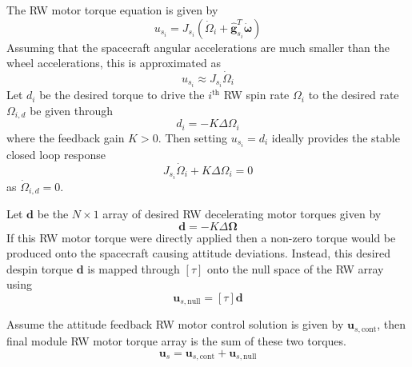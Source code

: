 The RW motor torque equation is given by\cite{schaub}
\begin{equation}
	u_{s_{i}} = J_{s_{i}} (\dot\Omega_{i} + \hat{\bm g}_{s_{i}}^{T} \dot{\bm \omega} )
\end{equation}
Assuming that the spacecraft angular accelerations are much smaller than the wheel accelerations, this is approximated as
\begin{equation}
	u_{s_{i}} \approx J_{s_{i}} \dot\Omega_{i}
\end{equation}
Let $d_{i}$ be the desired torque to drive the $i^{\text{th}}$ RW spin rate $\Omega_{i}$  to the desired rate $\Omega_{i,d}$ be given through
\begin{equation}
	d_{i} = - K \Delta\Omega_{i}
\end{equation}
where the feedback gain $K>0$.  Then setting $u_{s_{i}} = d_{i}$ ideally provides the stable closed loop response
\begin{equation}
	J_{s_{i}} \dot\Omega_{i} + K\Delta\Omega_{i} = 0
\end{equation}
as $\dot\Omega_{i,d} = 0$.  



Let $\bm d$ be the $N\times 1$ array of desired RW decelerating motor torques given by
\begin{equation}
	\bm d = -K \Delta\bm\Omega
\end{equation}
If this RW motor torque were directly applied then a non-zero torque would be produced onto the spacecraft causing attitude deviations.  Instead, this desired despin torque $\bm d$ is mapped through $[\tau]$ onto the null space of the RW array using
\begin{equation}
	\bm u_{s,\text{null}} = [\tau] \bm d
\end{equation}

Assume the attitude feedback RW motor control solution is given by $\bm u_{s,\text{cont}}$, then final module RW motor torque array is the sum of these two torques.
\begin{equation}
	\bm u_{s} = \bm u_{s,\text{cont}} + \bm u_{s,\text{null}} 
\end{equation}




